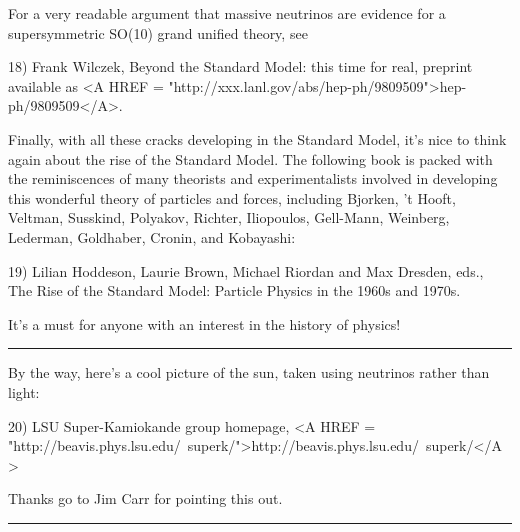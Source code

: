 For a very readable argument that massive neutrinos are evidence for a
supersymmetric SO(10) grand unified theory, see

18) Frank Wilczek, Beyond the Standard Model: this time for real, 
preprint available as
<A HREF = "http://xxx.lanl.gov/abs/hep-ph/9809509">hep-ph/9809509</A>.

Finally, with all these cracks developing in the Standard Model, it's nice
to think again about the rise of the Standard Model.  The following book
is packed with the reminiscences of many theorists and experimentalists
involved in developing this wonderful theory of particles and forces,
including Bjorken, 't Hooft, Veltman, Susskind, Polyakov, Richter,
Iliopoulos, Gell-Mann, Weinberg, Lederman, Goldhaber, Cronin, and
Kobayashi:

19) Lilian Hoddeson, Laurie Brown, Michael Riordan and Max Dresden,
eds., The Rise of the Standard Model: Particle Physics in the 1960s and
1970s.  

It's a must for anyone with an interest in the history of physics!

\par\noindent\rule{\textwidth}{0.4pt}
By the way, here's a cool picture of the sun, taken using neutrinos
rather than light:

20) LSU Super-Kamiokande group homepage, 
<A HREF = "http://beavis.phys.lsu.edu/~superk/">http://beavis.phys.lsu.edu/~superk/</A>

Thanks go to Jim Carr for pointing this out.


 \par\noindent\rule{\textwidth}{0.4pt}

